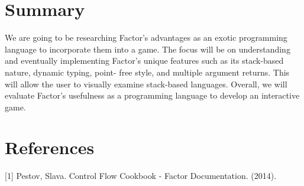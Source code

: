 \documentclass{sig-alternate}
\begin{document}
\section{Summary} We are going to be researching Factor's advantages
as an exotic programming language to incorporate them into a game. The
focus will be on understanding and eventually implementing Factor's
unique features such as its stack-based nature, dynamic typing, point-
free style, and multiple argument returns. This will allow the user to
visually examine stack-based languages. Overall, we will evaluate
Factor's usefulness as a programming language to develop an
interactive game.

\section*{References}
[1] Pestov, Slava. Control Flow Cookbook - Factor Documentation. 
(2014).



\balancecolumns
\end{document}
